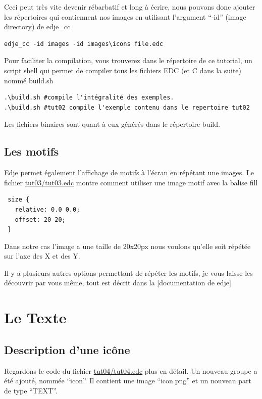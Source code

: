 \documentclass[a4paper]{efr}
\begin{document}
Ceci peut très vite devenir rébarbatif et long à écrire, nous pouvons donc
ajouter les répertoires qui contiennent nos images en utilisant l'argument
``-id'' (image directory) de edje\_cc

\begin{lstlisting}
edje_cc -id images -id images\icons file.edc
\end{lstlisting}

Pour faciliter la compilation, vous trouverez dans le répertoire de ce tutorial,
un script shell qui permet de compiler tous les fichiers EDC (et C dans la
suite) nommé build.sh

\begin{lstlisting}
.\build.sh #compile l'intégralité des exemples.
.\build.sh #tut02 compile l'exemple contenu dans le repertoire tut02
\end{lstlisting}

Les fichiers binaires sont quant à eux générés dans le répertoire build.

\subsection{Les motifs}
Edje permet également l'affichage de motifs à l'écran en répétant une images.
Le fichier \href{file://tut03/tut03.edc}{tut03/tut03.edc} montre comment
utiliser une image motif avec la balise fill
\begin{lstlisting}
 size {
   relative: 0.0 0.0;
   offset: 20 20;
 }
\end{lstlisting}

Dans notre cas l'image a une taille de 20x20px nous voulons qu'elle soit répétée
sur l'axe des X et des Y.

Il y a plusieurs autres options permettant de répéter les motifs, je vous laisse
les découvrir par vous même, tout est décrit dans la
\href{http://docs.enlightenment.org/auto/edje/edcref.html}[documentation de edje]


\section{Le Texte}

\subsection{Description d'une icône}
Regardons le code du fichier \href{file://tut04/tut04.edc}{tut04/tut04.edc} plus
en détail. Un nouveau groupe a été ajouté, nommée ``icon''. Il contient une
image ``icon.png'' et un nouveau part de type ``TEXT''.
\end{document}
